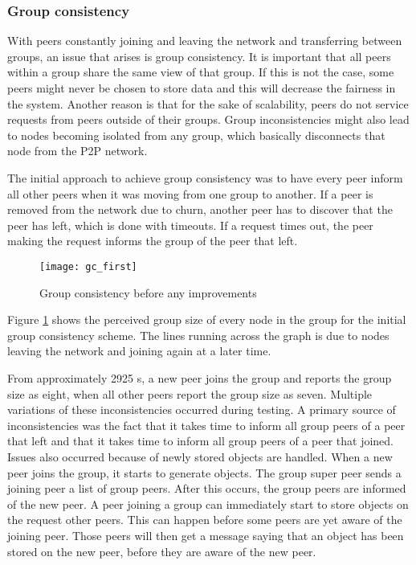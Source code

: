     \subsubsection{Group consistency}
    \label{group_consistency_implementation}

    With peers constantly joining and leaving the network and transferring between groups, an issue that arises is group consistency. It is important that all peers within a group share the same view of that group. If this is not the case, some peers might never be chosen to store data and this will decrease the fairness in the system. Another reason is that for the sake of scalability, peers do not service requests from peers outside of their groups. Group inconsistencies might also lead to nodes becoming isolated from any group, which basically disconnects that node from the P2P network.

The initial approach to achieve group consistency was to have every peer inform all other peers when it was moving from one group to another. If a peer is removed from the network due to churn, another peer has to discover that the peer has left, which is done with timeouts. If a request times out, the peer making the request informs the group of the peer that left.

\begin{figure}[htbp]
 \centering
 \texttt{[image: gc\_first]}
 \caption{Group consistency before any improvements}
 \label{fig_gc_first}
\end{figure}
%
Figure \ref{fig_gc_first} shows the perceived group size of every node in the group for the initial group consistency scheme. The lines running across the graph is due to nodes leaving the network and joining again at a later time.

From approximately 2925 s, a new peer joins the group and reports the group size as eight, when all other peers report the group size as seven. Multiple variations of these inconsistencies occurred during testing. A primary source of inconsistencies was the fact that it takes time to inform all group peers of a peer that left and that it takes time to inform all group peers of a peer that joined.
Issues also occurred because of newly stored objects are handled. When a new peer joins the group, it starts to generate objects. The group super peer sends a joining peer a list of group peers. After this occurs, the group peers are informed of the new peer. A peer joining a group can immediately start to store objects on the request other peers. This can happen before some peers are yet aware of the joining peer. Those peers will then get a message saying that an object has been stored on the new peer, before they are aware of the new peer.

